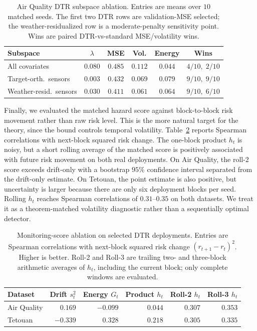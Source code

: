 \documentclass[conference]{IEEEtran}
\begin{document}
\begin{table}[t]
\caption{Air Quality DTR subspace ablation. Entries are means over $10$ matched seeds. The first two DTR rows are validation-MSE selected; the weather-residualized row is a moderate-penalty sensitivity point. Wins are paired DTR-vs-standard MSE/volatility wins.}
\centering
\setlength{\tabcolsep}{3.5pt}
\footnotesize
\begin{tabular}{lccccc}
\toprule
Subspace & $\lambda$ & MSE & Vol. & Energy & Wins \\
\midrule
All covariates & $0.080$ & $0.485$ & $0.112$ & $0.044$ & $4/10,\;2/10$ \\
Target-orth.\ sensors & $0.003$ & $0.432$ & $0.069$ & $0.079$ & $9/10,\;9/10$ \\
Weather-resid.\ sensors & $0.030$ & $0.411$ & $0.061$ & $0.064$ & $9/10,\;6/10$ \\
\bottomrule
\end{tabular}
\label{tab:aq-subspace}
\end{table}

Finally, we evaluated the matched hazard score against block-to-block risk movement rather than raw risk level. This is the more natural target for the theory, since the bound controls temporal volatility. Table~\ref{tab:monitoring-volatility} reports Spearman correlations with next-block squared risk change. The one-block product $h_t$ is noisy, but a short rolling average of the matched score is positively associated with future risk movement on both real deployments. On Air Quality, the roll-2 score exceeds drift-only with a bootstrap $95\%$ confidence interval separated from the drift-only estimate. On Tetouan, the point estimate is also positive, but uncertainty is larger because there are only six deployment blocks per seed. Rolling $h_t$ reaches Spearman correlations of $0.31$--$0.35$ on both datasets. We treat it as a theorem-matched volatility diagnostic rather than a sequentially optimal detector.

\begin{table}[t]
\caption{Monitoring-score ablation on selected DTR deployments. Entries are Spearman correlations with next-block squared risk change $(r_{t+1}-r_t)^2$. Higher is better. Roll-2 and Roll-3 are trailing two- and three-block arithmetic averages of $h_t$, including the current block; only complete windows are evaluated.}
\centering
\setlength{\tabcolsep}{3pt}
\footnotesize
\begin{tabular}{lrrrrr}
\toprule
Dataset & Drift $s_t^2$ & Energy $G_t$ & Product $h_t$ & Roll-2 $h_t$ & Roll-3 $h_t$ \\
\midrule
Air Quality & $0.169$ & $-0.099$ & $0.044$ & $0.307$ & $0.353$ \\
Tetouan & $-0.339$ & $0.328$ & $0.218$ & $0.305$ & $0.335$ \\
\bottomrule
\end{tabular}
\label{tab:monitoring-volatility}
\end{table}
\end{document}
